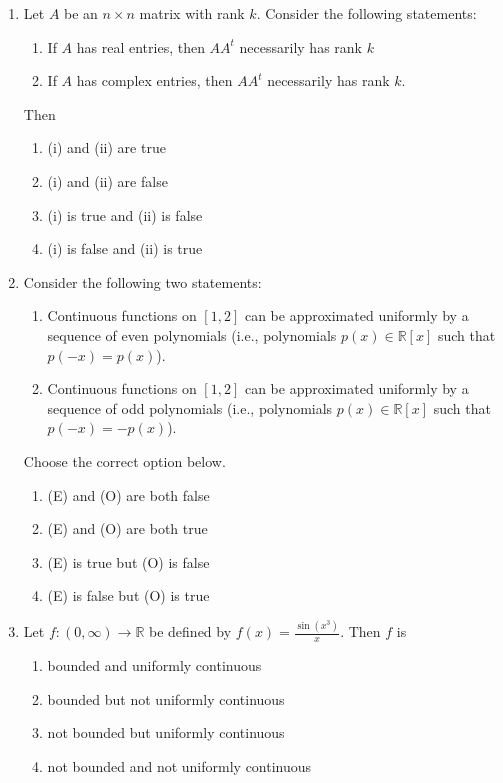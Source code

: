 \documentclass[11pt, a4paper]{article}
\begin{document}
\begin{enumerate}
  \item Let $A$ be an $n \times n$ matrix with rank $k$. Consider the following statements:
  \begin{enumerate}[label=(\roman*)]
    \item If $A$ has real entries, then $AA^t$ necessarily has rank $k$
    \item If $A$ has complex entries, then $AA^t$ necessarily has rank $k$.
  \end{enumerate}
  Then
  \begin{enumerate}[label=(\alph*)]
    \item (i) and (ii) are true
    \item (i) and (ii) are false
    \item (i) is true and (ii) is false
    \item (i) is false and (ii) is true
  \end{enumerate}

  \item Consider the following two statements:
  \begin{enumerate}[label=(\Alph*)]
    \item[(E)] Continuous functions on $[1,2]$ can be approximated uniformly by a sequence of even polynomials (i.e., polynomials $p(x) \in \mathbb{R}[x]$ such that $p(-x) = p(x)$).
    \item[(O)] Continuous functions on $[1,2]$ can be approximated uniformly by a sequence of odd polynomials (i.e., polynomials $p(x) \in \mathbb{R}[x]$ such that $p(-x) = -p(x)$).
  \end{enumerate}
  Choose the correct option below.
  \begin{enumerate}[label=(\alph*)]
    \item (E) and (O) are both false
    \item (E) and (O) are both true
    \item (E) is true but (O) is false
    \item (E) is false but (O) is true
  \end{enumerate}

  \item Let $f: (0,\infty) \to \mathbb{R}$ be defined by $f(x) = \frac{\sin(x^3)}{x}$. Then $f$ is
  \begin{enumerate}[label=(\alph*)]
    \item bounded and uniformly continuous
    \item bounded but not uniformly continuous
    \item not bounded but uniformly continuous
    \item not bounded and not uniformly continuous
  \end{enumerate}


\end{enumerate}
\end{document}
